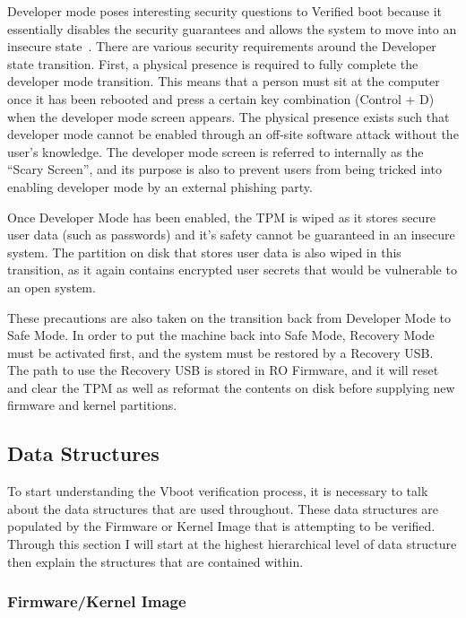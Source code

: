 \documentclass[../report.tex]{subfiles}
\begin{document}
Developer mode poses interesting security questions to Verified boot because it essentially disables the security guarantees and allows the system to move into an insecure state~\cite{developer-mode}. 
There are various security requirements around the Developer state transition.
First, a physical presence is required to fully complete the developer mode transition. 
This means that a person must sit at the computer once it has been rebooted and press a certain key combination (Control + D) when the developer mode screen appears.
The physical presence exists such that developer mode cannot be enabled through an off-site software attack without the user's knowledge.
The developer mode screen is referred to internally as the ``Scary Screen'', and its purpose is also to prevent users from being tricked into enabling developer mode by an external phishing party.

Once Developer Mode has been enabled, the TPM is wiped as it stores secure user data (such as passwords) and it's safety cannot be guaranteed in an insecure system.
The partition on disk that stores user data is also wiped in this transition, as it again contains encrypted user secrets that would be vulnerable to an open system.

These precautions are also taken on the transition back from Developer Mode to Safe Mode. 
In order to put the machine back into Safe Mode, Recovery Mode must be activated first, and the system must be restored by a Recovery USB\@.
The path to use the Recovery USB is stored in RO Firmware, and it will reset and clear the TPM as well as reformat the contents on disk before supplying new firmware and kernel partitions. 

\subsection{Data Structures}\label{sec:data-structures}

To start understanding the Vboot verification process, it is necessary to talk about the data structures that are used throughout. 
These data structures are populated by the Firmware or Kernel Image that is attempting to be verified.
Through this section I will start at the highest hierarchical level of data structure then explain the structures that are contained within.

\subsubsection{Firmware/Kernel Image}
\end{document}
